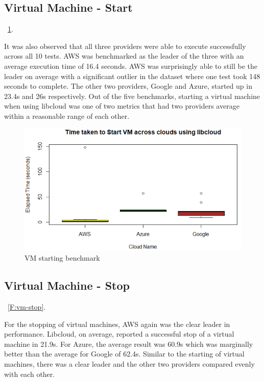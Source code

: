 \subsection{Virtual Machine - Start}~\ref{F:vm-start}.

It was also observed that all three providers were able to execute successfully
across all 10 tests. AWS was benchmarked as the leader of the three with an
average execution time of 16.4 seconds. AWS was surprisingly able to still be
the leader on average with a significant outlier in the dataset where one test
took 148 seconds to complete. The other two providers, Google and
Azure, started up in 23.4s and 26s respectively. Out of the five benchmarks,
starting a virtual machine when using libcloud was one of two metrics that had
two providers average within a reasonable range of each other. 

\begin{figure}[!ht]
  \centering
  \includegraphics[width=\columnwidth]{images/StartVM.png}
  \caption{VM starting benchmark}\label{F:vm-start}
\end{figure}

\subsection{Virtual Machine - Stop}~\ref{F:vm-stop}.

For the stopping of virtual machines, AWS again was the clear leader in
performance. Libcloud, on average, reported a successful stop of a virtual
machine in 21.9s. For Azure, the average result was 60.9s which was marginally
better than the average for Google of 62.4s. Similar to the starting of virtual
machines, there was a clear leader and the other two providers compared evenly
with each other.


